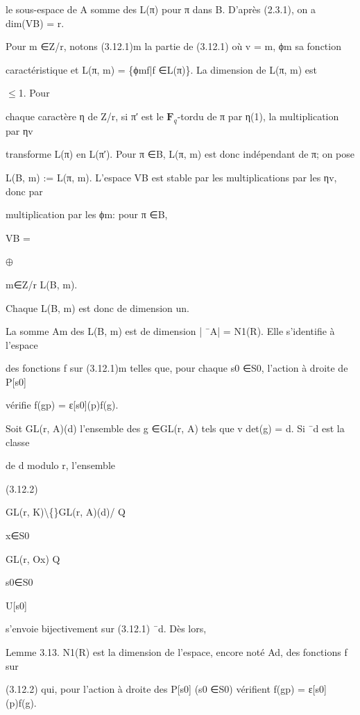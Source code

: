 \documentclass[11pt]{article}
\begin{document}
\noindent le sous-espace de A somme des L(π) pour π dans B. D’après (2.3.1), on a dim(VB) = r.\par
\noindent Pour m ∈Z/r, notons (3.12.1)m la partie de (3.12.1) où v = m, ϕm sa fonction\par
\noindent caractéristique et L(π, m) = \{ϕmf|f ∈L(π)\}. La dimension de L(π, m) est\par
\noindent \(\leq\)1. Pour\par
\noindent chaque caractère η de Z/r, si π′ est le \(\mathbf F_q\)-tordu de π par η(1), la multiplication par ηv\par
\noindent transforme L(π) en L(π′). Pour π ∈B, L(π, m) est donc indépendant de π; on pose\par
\noindent L(B, m) := L(π, m). L’espace VB est stable par les multiplications par les ηv, donc par\par
\noindent multiplication par les ϕm: pour π ∈B,\par
\noindent VB =\par
\noindent \(\oplus\)\par
\noindent m∈Z/r L(B, m).\par
\noindent Chaque L(B, m) est donc de dimension un.\par
\medskip
\noindent La somme Am des L(B, m) est de dimension | ¯A| = N1(R). Elle s’identifie à l’espace\par
\noindent des fonctions f sur (3.12.1)m telles que, pour chaque s0 ∈S0, l’action à droite de P[s0]\par
\noindent vérifie f(gp) = ε[s0](p)f(g).\par
\noindent Soit GL(r, A)(d) l’ensemble des g ∈GL(r, A) tels que v det(g) = d. Si ¯d est la classe\par
\noindent de d modulo r, l’ensemble\par
\noindent (3.12.2)\par
\noindent GL(r, K)\textbackslash\{\}GL(r, A)(d)/ Q\par
\noindent x∈S0\par
\noindent GL(r, Ox) Q\par
\noindent s0∈S0\par
\noindent U[s0]\par
\noindent s’envoie bijectivement sur (3.12.1) ¯d. Dès lors,\par
\noindent Lemme 3.13. N1(R) est la dimension de l’espace, encore noté Ad, des fonctions f sur\par
\noindent (3.12.2) qui, pour l’action à droite des P[s0] (s0 ∈S0) vérifient f(gp) = ε[s0](p)f(g).\par
\end{document}
